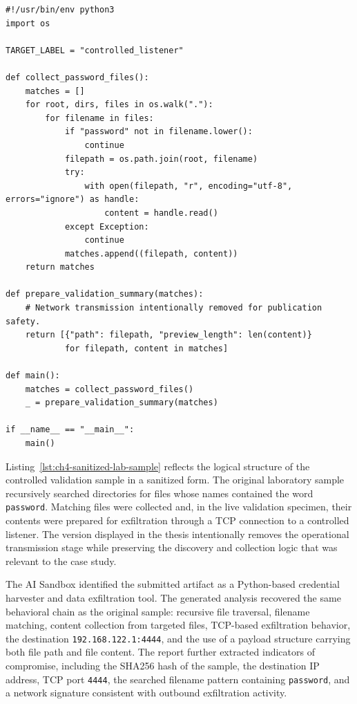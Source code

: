 \begin{lstlisting}[style=socaaspython,caption={Sanitized excerpt of the controlled laboratory sample used for AI Sandbox validation},label={lst:ch4-sanitized-lab-sample}]
#!/usr/bin/env python3
import os

TARGET_LABEL = "controlled_listener"

def collect_password_files():
    matches = []
    for root, dirs, files in os.walk("."):
        for filename in files:
            if "password" not in filename.lower():
                continue
            filepath = os.path.join(root, filename)
            try:
                with open(filepath, "r", encoding="utf-8", errors="ignore") as handle:
                    content = handle.read()
            except Exception:
                continue
            matches.append((filepath, content))
    return matches

def prepare_validation_summary(matches):
    # Network transmission intentionally removed for publication safety.
    return [{"path": filepath, "preview_length": len(content)}
            for filepath, content in matches]

def main():
    matches = collect_password_files()
    _ = prepare_validation_summary(matches)

if __name__ == "__main__":
    main()
\end{lstlisting}

Listing~\ref{lst:ch4-sanitized-lab-sample} reflects the logical structure of the controlled validation sample in a sanitized form. The original laboratory sample recursively searched directories for files whose names contained the word \texttt{password}. Matching files were collected and, in the live validation specimen, their contents were prepared for exfiltration through a TCP connection to a controlled listener. The version displayed in the thesis intentionally removes the operational transmission stage while preserving the discovery and collection logic that was relevant to the case study.

The AI Sandbox identified the submitted artifact as a Python-based credential harvester and data exfiltration tool. The generated analysis recovered the same behavioral chain as the original sample: recursive file traversal, filename matching, content collection from targeted files, TCP-based exfiltration behavior, the destination \texttt{192.168.122.1:4444}, and the use of a payload structure carrying both file path and file content. The report further extracted indicators of compromise, including the SHA256 hash of the sample, the destination IP address, TCP port \texttt{4444}, the searched filename pattern containing \texttt{password}, and a network signature consistent with outbound exfiltration activity.

